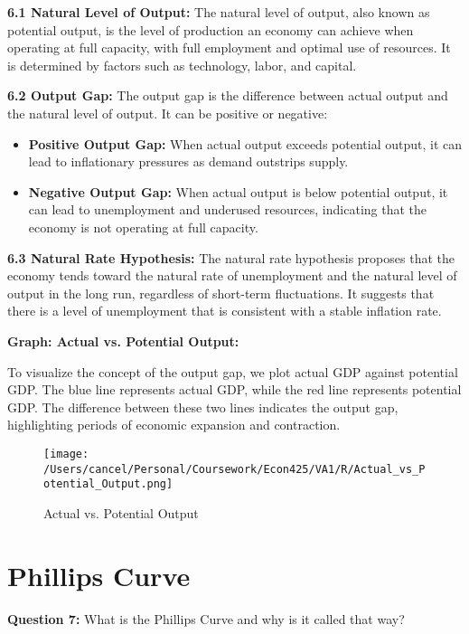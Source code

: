 \documentclass{article}
\begin{document}
\textbf{6.1 Natural Level of Output:} The natural level of output, also known as potential output, is the level of production an economy can achieve when operating at full capacity, with full employment and optimal use of resources. It is determined by factors such as technology, labor, and capital.

\textbf{6.2 Output Gap:} The output gap is the difference between actual output and the natural level of output. It can be positive or negative:

\begin{itemize}
    \item \textbf{Positive Output Gap:} When actual output exceeds potential output, it can lead to inflationary pressures as demand outstrips supply.
    \item \textbf{Negative Output Gap:} When actual output is below potential output, it can lead to unemployment and underused resources, indicating that the economy is not operating at full capacity.
\end{itemize}

\textbf{6.3 Natural Rate Hypothesis:} The natural rate hypothesis proposes that the economy tends toward the natural rate of unemployment and the natural level of output in the long run, regardless of short-term fluctuations. It suggests that there is a level of unemployment that is consistent with a stable inflation rate.

\textbf{Graph: Actual vs. Potential Output:} 

To visualize the concept of the output gap, we plot actual GDP against potential GDP. The blue line represents actual GDP, while the red line represents potential GDP. The difference between these two lines indicates the output gap, highlighting periods of economic expansion and contraction.

\begin{figure}[h!]
    \centering
    \texttt{[image: /Users/cancel/Personal/Coursework/Econ425/VA1/R/Actual\_vs\_Potential\_Output.png]}
    \caption{Actual vs. Potential Output}
\end{figure}

\hrulefill

\section{Phillips Curve}

\textbf{Question 7:} What is the Phillips Curve and why is it called that way?
\end{document}
